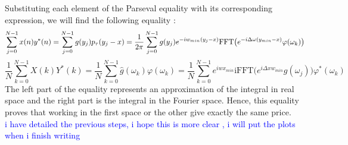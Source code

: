 \documentclass[12pt]{report}
\begin{document}
Substituting each element of the Parseval equality with its corresponding expression, we will find the following equality :
\begin{equation}
\label{sum}
\sum \limits_{j=0}^{N-1} x(n)y^*(n)= \sum \limits_{j=0}^{N-1} g(y_j) p_{\tau}(y_j-x)\\
=\frac{1}{2 \pi}\sum \limits_{j=0}^{N-1} g(y_j)e^{- iw_{min} (y_j-x)} \text{FFT} \big ( e^{-i \Delta\omega (y_{min}-x) } \varphi(\omega_k) \big)
\end{equation}
\begin{equation}
\label{rm2}
\frac{1}{N} \sum \limits_{k=0}^{N-1} X(k)Y^*(k)=\frac{1}{N}\sum \limits_{k=0}^{N-1} \hat{g}(\omega_k) \varphi(\omega_k)=\frac{1}{N}\sum \limits_{k=0}^{N-1}e^{i w x_{min}} \text{iFFT}\big ( e^{i \Delta x w_{min} } g(\omega_j) \big) \varphi^*(\omega_k)
\end{equation}
The left part of the equality represents an approximation of the integral in real space and the  right part is the integral in the Fourier space. Hence, this equality proves that working in the first space or the other give exactly the same price.\\
\textcolor{blue}{ i have detailed the previous steps, i hope this is more clear , i will put the plots when i finish writing  } \\
\end{document}
